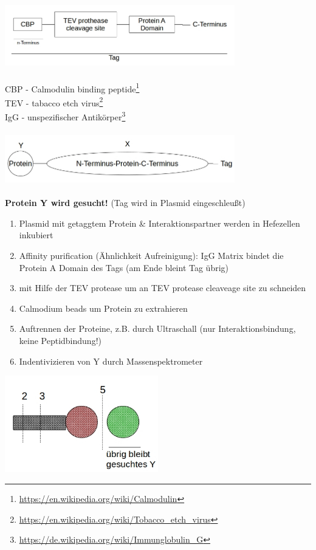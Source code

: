\includegraphics[width=0.75\textwidth]{lectures/160513/pix/1.jpg}
\\\\
CBP - Calmodulin binding peptide\footnote{\url{https://en.wikipedia.org/wiki/Calmodulin}}\\
TEV - tabacco etch virus\footnote{\url{https://en.wikipedia.org/wiki/Tobacco_etch_virus}}\\
IgG - unspezifischer Antikörper\footnote{\url{https://de.wikipedia.org/wiki/Immunglobulin_G}}
\\\\
\includegraphics[width=0.75\textwidth]{lectures/160513/pix/2.jpg}
\\\\
\textbf{Protein Y wird gesucht!} (Tag wird in Plasmid eingeschleußt)

\begin{enumerate}
	\item Plasmid mit getaggtem Protein \& Interaktionspartner werden in Hefezellen inkubiert
	\item Affinity purification (Ähnlichkeit Aufreinigung): IgG Matrix bindet die Protein A Domain des Tags (am Ende bleint Tag übrig)
	\item mit Hilfe der TEV protease um an TEV protease cleaveage site zu schneiden
	\item Calmodium beads um Protein zu extrahieren
	\item Auftrennen der Proteine, z.B. durch Ultraschall (nur Interaktionsbindung, keine Peptidbindung!)
	\item Indentivizieren von Y durch Massenspektrometer
\end{enumerate}

\includegraphics[width=0.5\textwidth]{lectures/160513/pix/3.jpg}

